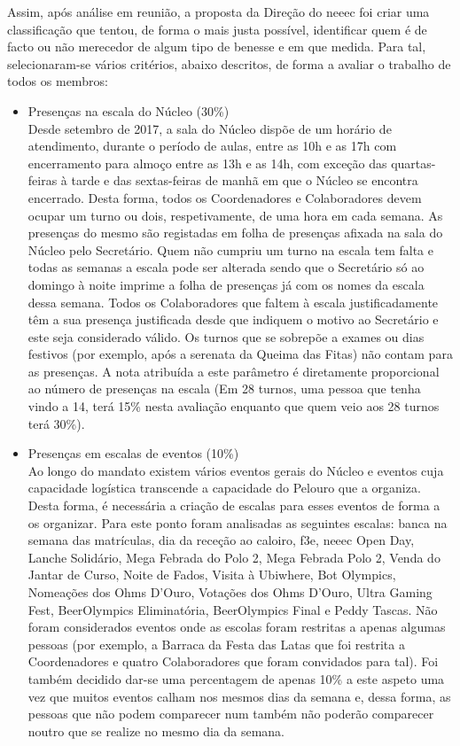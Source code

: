 Assim, após análise em reunião, a proposta da Direção do \acrshort{neeec} foi criar uma classificação que tentou, de forma o mais justa possível, identificar quem é de facto ou não merecedor de algum tipo de benesse e em que medida. Para tal, selecionaram-se vários critérios, abaixo descritos, de forma a avaliar o trabalho de todos os membros:
\begin{itemize}
\item Presenças na escala do Núcleo (30\%)\\
Desde setembro de 2017, a sala do Núcleo dispõe de um horário de atendimento, durante o período de aulas, entre as 10h e as 17h com encerramento para almoço entre as 13h e as 14h, com exceção das quartas-feiras à tarde e das sextas-feiras de manhã em que o Núcleo se encontra encerrado. Desta forma, todos os Coordenadores e Colaboradores devem ocupar um turno ou dois, respetivamente, de uma hora em cada semana. As presenças do mesmo são registadas em folha de presenças afixada na sala do Núcleo pelo Secretário. Quem não cumpriu um turno na escala tem falta e todas as semanas a escala pode ser alterada sendo que o Secretário só ao domingo à noite imprime a folha de presenças já com os nomes da escala dessa semana. Todos os Colaboradores que faltem à escala justificadamente têm a sua presença justificada desde que indiquem o motivo ao Secretário e este seja considerado válido. Os turnos que se sobrepõe a exames ou dias festivos (por exemplo, após a serenata da Queima das Fitas) não contam para as presenças.
A nota atribuída a este parâmetro é diretamente proporcional ao número de presenças na escala (Em 28 turnos, uma pessoa que tenha vindo a 14, terá 15\% nesta avaliação enquanto que quem veio aos 28 turnos terá 30\%).
\item Presenças em escalas de eventos (10\%)\\
Ao longo do mandato existem vários eventos gerais do Núcleo e eventos cuja capacidade logística transcende a capacidade do Pelouro que a organiza. Desta forma, é necessária a criação de escalas para esses eventos de forma a os organizar. Para este ponto foram analisadas as seguintes escalas: banca na semana das matrículas, dia da receção ao caloiro, \acrshort{f3e}, \acrshort{neeec} Open Day, Lanche Solidário, Mega Febrada do Polo 2, Mega Febrada Polo 2, Venda do Jantar de Curso, Noite de Fados, Visita à Ubiwhere, Bot Olympics, Nomeações dos Ohms D’Ouro, Votações dos Ohms D’Ouro, Ultra Gaming Fest, BeerOlympics Eliminatória, BeerOlympics Final e Peddy Tascas. Não foram considerados eventos onde as escolas foram restritas a apenas algumas pessoas (por exemplo, a Barraca da Festa das Latas que foi restrita a Coordenadores e quatro Colaboradores que foram convidados para tal). Foi também decidido dar-se uma percentagem de apenas 10\% a este aspeto uma vez que muitos eventos calham nos mesmos dias da semana e, dessa forma, as pessoas que não podem comparecer num também não poderão comparecer noutro que se realize no mesmo dia da semana.\\

\end{itemize}
